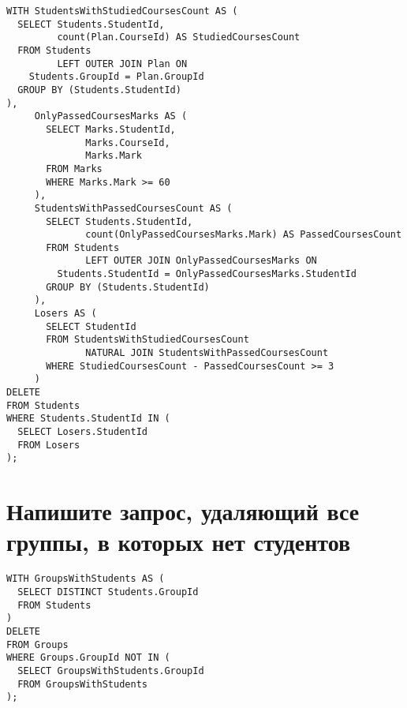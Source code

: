 \documentclass{article}
\begin{document}
\begin{verbatim}
WITH StudentsWithStudiedCoursesCount AS (
  SELECT Students.StudentId,
         count(Plan.CourseId) AS StudiedCoursesCount
  FROM Students
         LEFT OUTER JOIN Plan ON
    Students.GroupId = Plan.GroupId
  GROUP BY (Students.StudentId)
),
     OnlyPassedCoursesMarks AS (
       SELECT Marks.StudentId,
              Marks.CourseId,
              Marks.Mark
       FROM Marks
       WHERE Marks.Mark >= 60
     ),
     StudentsWithPassedCoursesCount AS (
       SELECT Students.StudentId,
              count(OnlyPassedCoursesMarks.Mark) AS PassedCoursesCount
       FROM Students
              LEFT OUTER JOIN OnlyPassedCoursesMarks ON
         Students.StudentId = OnlyPassedCoursesMarks.StudentId
       GROUP BY (Students.StudentId)
     ),
     Losers AS (
       SELECT StudentId
       FROM StudentsWithStudiedCoursesCount
              NATURAL JOIN StudentsWithPassedCoursesCount
       WHERE StudiedCoursesCount - PassedCoursesCount >= 3
     )
DELETE
FROM Students
WHERE Students.StudentId IN (
  SELECT Losers.StudentId
  FROM Losers
);
\end{verbatim}

\section{Напишите запрос, удаляющий все группы, в которых нет студентов}

\begin{verbatim}
WITH GroupsWithStudents AS (
  SELECT DISTINCT Students.GroupId
  FROM Students
)
DELETE
FROM Groups
WHERE Groups.GroupId NOT IN (
  SELECT GroupsWithStudents.GroupId
  FROM GroupsWithStudents
);
\end{verbatim}
\end{document}
